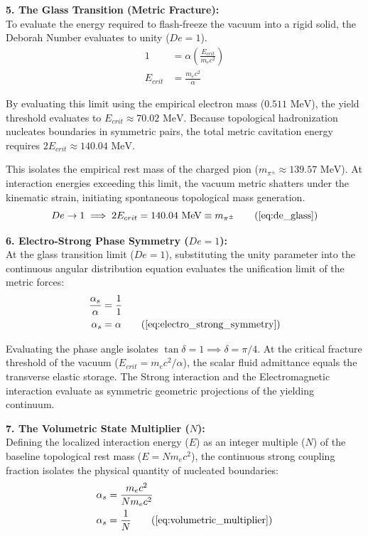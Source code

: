 \documentclass[11pt, a4paper]{article}
\begin{document}
\textbf{5. The Glass Transition (Metric Fracture):} \\
To evaluate the energy required to flash-freeze the vacuum into a rigid solid, the Deborah Number evaluates to unity ($De = 1$). 
\begin{align}
    1 &= \alpha \left( \frac{E_{crit}}{m_e c^2} \right) \\
    E_{crit} &= \frac{m_e c^2}{\alpha}
\end{align}

By evaluating this limit using the empirical electron mass ($0.511 \text{ MeV}$), the yield threshold evaluates to $E_{crit} \approx 70.02 \text{ MeV}$. Because topological hadronization nucleates boundaries in symmetric pairs, the total metric cavitation energy requires $2 E_{crit} \approx 140.04 \text{ MeV}$. 

This isolates the empirical rest mass of the charged pion ($m_{\pi^{\pm}} \approx 139.57 \text{ MeV}$). At interaction energies exceeding this limit, the vacuum metric shatters under the kinematic strain, initiating spontaneous topological mass generation.
\begin{equation}
    De \to 1 \implies 2 E_{crit} = 140.04 \text{ MeV} \equiv m_{\pi^{\pm}} \tag{\ref{eq:de_glass}}
\end{equation}

\textbf{6. Electro-Strong Phase Symmetry ($De = 1$):} \\
At the glass transition limit ($De = 1$), substituting the unity parameter into the continuous angular distribution equation evaluates the unification limit of the metric forces:
\begin{align}
    \frac{\alpha_s}{\alpha} &= \frac{1}{1} \\
    \alpha_s &= \alpha \tag{\ref{eq:electro_strong_symmetry}}
\end{align}

Evaluating the phase angle isolates $\tan \delta = 1 \implies \delta = \pi/4$. At the critical fracture threshold of the vacuum ($E_{crit} = m_e c^2 / \alpha$), the scalar fluid admittance equals the transverse elastic storage. The Strong interaction and the Electromagnetic interaction evaluate as symmetric geometric projections of the yielding continuum.

\textbf{7. The Volumetric State Multiplier ($N$):} \\
Defining the localized interaction energy ($E$) as an integer multiple ($N$) of the baseline topological rest mass ($E = N m_e c^2$), the continuous strong coupling fraction isolates the physical quantity of nucleated boundaries:
\begin{align}
    \alpha_s &= \frac{m_e c^2}{N m_e c^2} \\
    \alpha_s &= \frac{1}{N} \tag{\ref{eq:volumetric_multiplier}}
\end{align}
\end{document}
